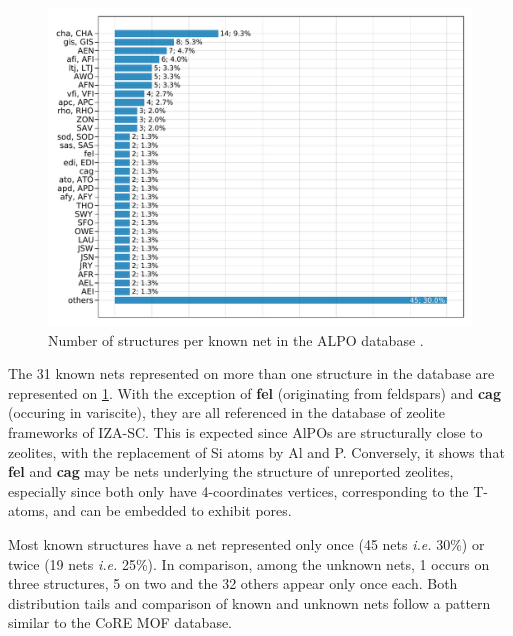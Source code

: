 \documentclass[main.tex]{subfiles}
\begin{document}
\begin{figure}[t]
	\centering
	\includegraphics[width=\linewidth]{figures/topology/numstructpernetalpos.pdf}
	\caption{Number of structures per known net in the ALPO database \autocite{ALPO}.}
	\label{numstructpernetalpos}
\end{figure}

The 31 known nets represented on more than one structure in the database are represented on \cref{numstructpernetalpos}. With the exception of \textbf{fel} (originating from feldspars) and \textbf{cag} (occuring in variscite), they are all referenced in the database of zeolite frameworks of IZA-SC. This is expected since AlPOs are structurally close to zeolites, with the replacement of Si atoms by Al and P. Conversely, it shows that \textbf{fel} and \textbf{cag} may be nets underlying the structure of unreported zeolites, especially since both only have 4-coordinates vertices, corresponding to the T-atoms, and can be embedded to exhibit pores.

Most known structures have a net represented only once (45 nets \textit{i.e.} {30\%}) or twice (19 nets \textit{i.e.} {25\%}). In comparison, among the unknown nets, 1 occurs on three structures, 5 on two and the 32 others appear only once each. Both distribution tails and comparison of known and unknown nets follow a pattern similar to the CoRE MOF database.\\
\end{document}
